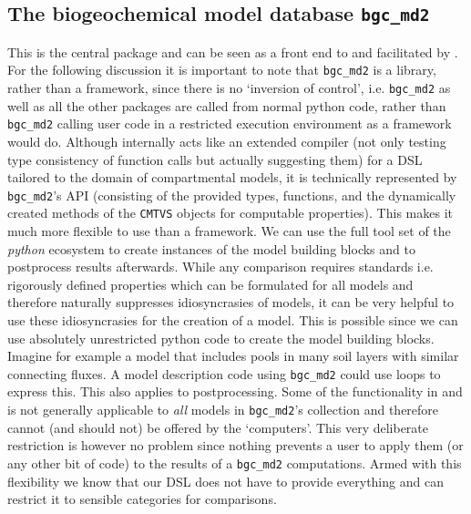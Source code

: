 \subsection{The biogeochemical model database \texttt{bgc\_md2}} This is the
central package and can be seen as a front end to \CompartmentalSystems{} and
\LAPM{} facilitated by \ComputabilityGraphs{}.  For the following discussion it is
important to note that \texttt{bgc\_md2} is a library, rather than a framework,
since there is no `inversion of control', i.e. \texttt{bgc\_md2} as well as all
the other packages are called from normal python code, rather than
\texttt{bgc\_md2} calling user code in a restricted execution environment as a
framework would do.  Although internally \ComputabilityGraphs{} acts like an
extended  compiler  (not only testing type consistency of function calls but
actually suggesting them) for a DSL tailored to the domain of compartmental
models, it is technically represented by \texttt{bgc\_md2}'s API (consisting of
the provided types, functions, and the dynamically created methods of the
\texttt{CMTVS} objects for computable properties).  This makes it much more
flexible to use than a framework. We can use the full tool set of the
\emph{python} ecosystem to create instances of the model building blocks and to
postprocess results afterwards.  While any comparison requires standards i.e.
rigorously defined properties which can be formulated for all models and
therefore naturally suppresses idiosyncrasies of models, it can be very helpful
to use these idiosyncrasies for the creation of a model.  This is possible
since we can use absolutely unrestricted python code to create the model
building blocks.  Imagine for example a model that includes pools in many soil
layers with similar connecting fluxes. A model description code using
\texttt{bgc\_md2} could use loops to express this.  This also applies to
postprocessing. Some of the functionality in \LAPM{} and \CompartmentalSystems{} is
not generally applicable to \emph{all} models in \texttt{bgc\_md2}'s collection
and therefore cannot (and should not) 
be offered by the `computers'. 
This very deliberate restriction is however no problem since 
nothing prevents a user to apply them (or any other bit of code) to the results of a
\texttt{bgc\_md2} computations.  
Armed with this flexibility we know that our
DSL does not have to provide everything and can restrict it to sensible categories
for comparisons.
